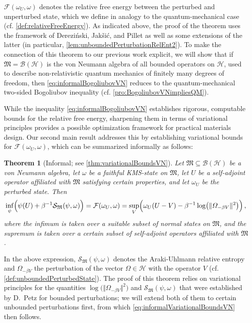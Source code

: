 \documentclass[a4paper, twoside, 11pt, reqno]{amsart}
\theoremstyle{definition}
\theoremstyle{plain}
\newtheorem*{theorem*}{Theorem}
\renewcommand{\subset}{\subseteq}
\renewcommand{\Omega}{\varOmega}
\newcommand{\MF}{\mathcal{F}}
\newcommand{\MH}{\mathcal{H}}
\newcommand{\MS}{\mathcal{S}}
\newcommand{\MFM}{\mathfrak{M}}
\newcommand{\BO}{\mathscr{B}}
\newcommand{\1}{\mathbf{1}}
\newcommand{\norm}[2][]{#1\Vert{#2}#1\Vert}
\newcommand{\inv}[1]{#1^{-1}}
\begin{document}
$\MF(\omega_U, \omega)$ denotes the relative free energy between the perturbed and unperturbed state, which we define in analogy to the quantum-mechanical case (cf. \cref{def:relativeFreeEnergy}). As indicated above, the proof of the theorem uses the framework of Derezi\'{n}ski, Jak\v{s}i\'{c}, and Pillet \cite{DJP03} as well as some extensions of the latter (in particular, \cref{lem:unboundedPerturbationRelEnt2}). To make the connection of this theorem to our previous work \cite{Reible2022} explicit, we will show that if $\MFM = \BO(\MH)$ is the von Neumann algebra of all bounded operators on $\MH$, used to describe non-relativistic quantum mechanics of finitely many degrees of freedom, then \cref{eq:informalBogoliubovVN} reduces to the quantum-mechanical two-sided Bogoliubov inequality (cf. \cref{pro:BogoliubovVNimpliesQM}).

While the inequality \eqref{eq:informalBogoliubovVN} establishes rigorous, computable bounds for the relative free energy, sharpening them in terms of variational principles provides a possible optimization framework for practical materials design. Our second main result addresses this by establishing variational bounds for $\MF(\omega_U, \omega)$, which can be summarized informally as follows:

\begin{theorem*}[Informal; see \cref{thm:variationalBoundsVN}]
    Let $\MFM \subset \BO(\MH)$ be a von Neumann algebra, let $\omega$ be a faithful KMS-state on $\MFM$, let $U$ be a self-adjoint operator affiliated with $\MFM$ satisfying certain properties, and let $\omega_U$ be the perturbed state. Then
    \begin{equation}\label{eq:informalVariationalBoundsVN}
        \inf_{\psi} \Bigl(\psi(U) + \inv{\beta} \MS_\MFM(\psi, \omega)\Bigr) = \MF(\omega_U, \omega) = \sup_{V} \Bigl(\omega_U(U - V) - \inv{\beta} \log \bigl(\norm{\Omega_{- \beta V}}^2\bigr)\Bigr) \, ,
    \end{equation}
    where the infimum is taken over a suitable subset of normal states on $\MFM$, and the supremum is taken over a certain subset of self-adjoint operators affiliated with $\MFM$.
\end{theorem*}

In the above expression, $\MS_\MFM(\psi, \omega)$ denotes the Araki-Uhlmann relative entropy and $\Omega_{- \beta V}$ the perturbation of the vector $\Omega \in \MH$ with the operator $V$ (cf. \cref{def:unboundedPerturbedState}). The proof of this theorem relies on variational principles for the quantities $\log \bigl(\norm{\Omega_{- \beta V}}^2\bigr)$ and $\MS_\MFM(\psi, \omega)$ that were established by D.~Petz \cite{Petz1988} for bounded perturbations; we will extend both of them to certain unbounded perturbations first, from which \cref{eq:informalVariationalBoundsVN} then follows.
\end{document}
